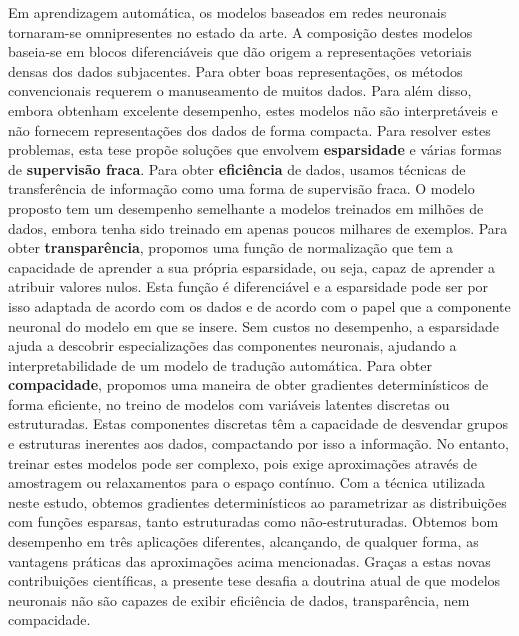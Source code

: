 \begin{resumo}

    \noindent Em aprendizagem automática, os modelos baseados em
    redes neuronais tornaram-se omnipresentes no estado da arte. A
    composição destes modelos baseia-se em blocos diferenciáveis que
    dão origem a representações vetoriais densas dos dados
    subjacentes. Para obter boas representações, os métodos
    convencionais requerem o manuseamento de muitos dados. Para além
    disso, embora obtenham excelente desempenho, estes modelos não
    são interpretáveis e não fornecem representações dos dados de
    forma compacta. Para resolver estes problemas, esta tese propõe
    soluções que envolvem \textbf{esparsidade} e várias formas de
    \textbf{supervisão fraca}. Para obter \textbf{eficiência} de
    dados, usamos técnicas de transferência de informação como uma
    forma de supervisão fraca. O modelo proposto tem um desempenho
    semelhante a modelos treinados em milhões de dados, embora tenha
    sido treinado em apenas poucos milhares de exemplos. Para obter
    \textbf{transparência}, propomos uma função de normalização que
    tem a capacidade de aprender a sua própria esparsidade, ou seja,
    capaz de aprender a atribuir valores nulos. Esta função é
    diferenciável e a esparsidade pode ser por isso adaptada de
    acordo com os dados e de acordo com o papel que a componente
    neuronal do modelo em que se insere. Sem custos no desempenho, a
    esparsidade ajuda a descobrir especializações das componentes
    neuronais, ajudando a interpretabilidade de um modelo de tradução
    automática. Para obter \textbf{compacidade}, propomos uma maneira
    de obter gradientes determinísticos de forma eficiente, no treino
    de modelos com variáveis latentes discretas ou estruturadas.
    Estas componentes discretas têm a capacidade de desvendar grupos
    e estruturas inerentes aos dados, compactando por isso a
    informação. No entanto, treinar estes modelos pode ser complexo,
    pois exige aproximações através de amostragem ou relaxamentos
    para o espaço contínuo. Com a técnica utilizada neste estudo,
    obtemos gradientes determinísticos ao parametrizar as
    distribuições com funções esparsas, tanto estruturadas como
    não-estruturadas. Obtemos bom desempenho em três aplicações
    diferentes, alcançando, de qualquer forma, as vantagens práticas
    das aproximações acima mencionadas. Graças a estas novas
    contribuições científicas, a presente tese desafia a doutrina
    atual de que modelos neuronais não são capazes de exibir
    eficiência de dados, transparência, nem compacidade.


\end{resumo}
